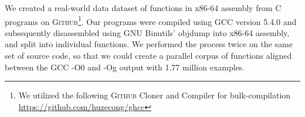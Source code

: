\documentclass{article}
\newcommand{\GH}{\textsc{Github}}
\begin{document}





We created a real-world data dataset of functions in x86-64 assembly from C programs on \GH \footnote{We utilized the following \GH{}  Cloner and Compiler for bulk-compilation \url{https://github.com/huzecong/ghcc}}. Our programs were compiled using GCC version 5.4.0 and subsequently disassembled using \textsc{GNU} Binutils’ objdump into x86-64 assembly, and split into individual functions. We performed the process twice on the same set of source code, so that we could create a parallel corpus of functions aligned between the GCC -O0 and -Og output with 1.77 million examples. 
\end{document}
